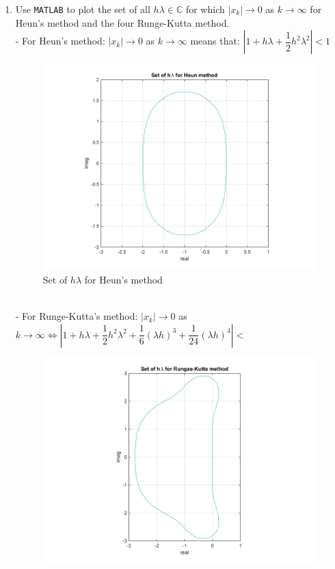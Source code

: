 \documentclass[14pt,a4paper]{article}
\begin{document}
\begin{enumerate}
	\label{1d}
	\item Use \texttt{MATLAB} to plot the set of all $h\lambda \in \mathbb{C}$ for which $|x_k| \rightarrow 0$ as $k \rightarrow \infty$ for Heun's method and the four Runge-Kutta method.\\
	- For Heun's method: $|x_k| \rightarrow 0$ as $k \rightarrow \infty$ means that: $\left| 1+ h\lambda + \dfrac{1}{2}h^2\lambda^2\right| < 1$
	\begin{figure}[htp]
		\centering
		\includegraphics[scale=0.5]{hw6_d1.png}
		\caption{Set of $h\lambda$ for Heun's method}
	\end{figure}\\
	- For Runge-Kutta's method: $|x_k| \rightarrow 0$ as $k \rightarrow \infty \Leftrightarrow \left| 1+ h\lambda + \dfrac{1}{2}h^2\lambda^2 + \dfrac{1}{6}(\lambda h)^3 + \dfrac{1}{24}(\lambda h)^4 \right|<$
	\begin{figure}[htp]
		\centering
		\includegraphics[scale=0.6]{hw6_d2.png}

\end{figure}
\end{enumerate}
\end{document}
